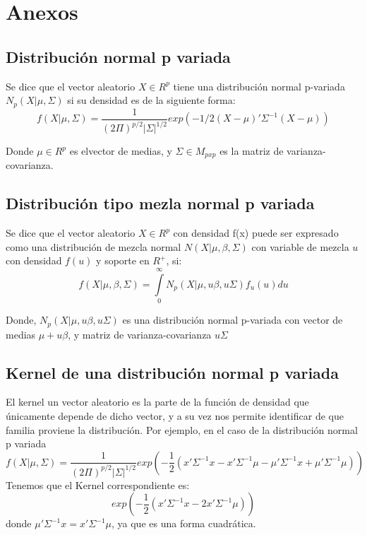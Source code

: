 \documentclass[11pt]{book}
\begin{document}
\chapter*{Anexos}
\section*{Distribución normal p variada}
Se dice que el vector aleatorio $X\in R^{p}$ tiene una distribución normal p-variada $N_{p}(X|\mu,\Sigma)$ si su densidad es de la siguiente forma:
\begin{equation*}
f(X|\mu,\Sigma)=\dfrac{1}{(2\Pi)^{p/2}|\Sigma|^{1/2}}exp(-1/2(X-\mu)'\Sigma^{-1}(X-\mu))
\end{equation*}

Donde $\mu\in R^{p}$ es elvector de medias, y $\Sigma\in M_{pxp}$ es la matriz de varianza-covarianza.

\section*{Distribución tipo mezla normal p variada}
Se dice que el vector aleatorio $X\in R^{p}$ con densidad f(x) puede ser expresado como una distribución de mezcla normal $N(X|\mu,\beta,\Sigma)$ con variable de mezcla $u$ con densidad $f(u)$ y soporte en $R^{+}$, si:
\begin{equation*}
f(X|\mu,\beta,\Sigma)=\underset{0}{\overset{\infty }{\int }}N_{p}(X|\mu,u\beta,u\Sigma)f_{u}(u)du 
\end{equation*}

Donde, $N_{p}(X|\mu,u\beta,u\Sigma)$ es una distribución normal p-variada con vector de medias $\mu+u\beta$, y matriz de varianza-covarianza $u\Sigma$

\section*{Kernel de una distribución normal p variada}
El kernel un vector aleatorio es la parte de la función de densidad que únicamente depende de dicho vector, y a su vez nos permite identificar de que familia proviene la distribución. Por ejemplo, en el caso de la distribución normal p variada
\begin{equation*}
f(X|\mu,\Sigma)=\dfrac{1}{(2\Pi)^{p/2}|\Sigma|^{1/2}}exp(-\dfrac{1}{2}(x'\Sigma^{-1}x - x'\Sigma^{-1}\mu -\mu'\Sigma^{-1}x+\mu'\Sigma^{-1}\mu))
\end{equation*}
Tenemos que el Kernel correspondiente es:
\begin{equation*}
exp(-\dfrac{1}{2}(x'\Sigma^{-1}x -2x'\Sigma^{-1}\mu))
\end{equation*}
donde $\mu'\Sigma^{-1}x=x'\Sigma^{-1}\mu$, ya que es una forma cuadrática.
\end{document}
